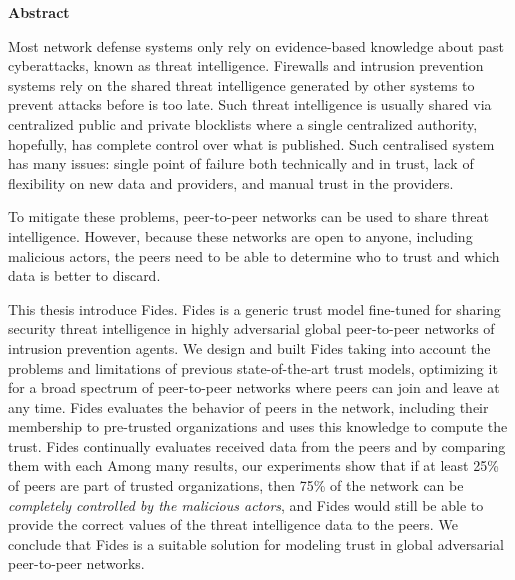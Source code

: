 \newenvironment{abstractpage}
  {\cleardoublepage\thispagestyle{empty}}
  {\vfill\cleardoublepage}
\newenvironment{abstract}[1]
  {\bigskip
   \begin{center}\bfseries#1\end{center}\small\leftskip=0.5cm\rightskip=0.5cm}
  {\par\bigskip}

\providecommand{\keywords}[2]{\footnotesize\textbf{\textit{#1:}} #2}

\begin{abstractpage}
\begin{abstract}{Abstract}

Most network defense systems only rely on evidence-based knowledge about past cyberattacks, known as threat intelligence. Firewalls and intrusion prevention systems rely on the shared threat intelligence generated by other systems to prevent attacks before is too late.
Such threat intelligence is usually shared via centralized public and private blocklists where a single centralized authority, hopefully, has complete control over what is published. Such centralised system has many issues: single point of failure both technically and in trust, lack of flexibility on new data and providers, and manual trust in the providers.

To mitigate these problems, peer-to-peer networks can be used to share threat intelligence. However, because these networks are open to anyone, including malicious actors, the peers need to be able to determine who to trust and which data is better to discard.

This thesis introduce Fides. Fides is a generic trust model fine-tuned for sharing security threat intelligence in highly adversarial global peer-to-peer networks of intrusion prevention agents.
We design and built Fides taking into account the problems and limitations of previous state-of-the-art trust models, optimizing it for a broad spectrum of peer-to-peer networks where peers can join and leave at any time.
Fides evaluates the behavior of peers in the network, including their membership to pre-trusted organizations and uses this knowledge to compute the trust.
Fides continually evaluates received data from the peers and by comparing them with each
Among many results, our experiments show that if at least 25\% of peers are part of trusted organizations, then 75\% of the network can be \textit{completely controlled by the malicious actors}, and Fides would still be able to provide the correct values of the threat intelligence data to the peers. We conclude that Fides is a suitable solution for modeling trust in global adversarial peer-to-peer networks. 


\end{abstract}
\end{abstractpage}
